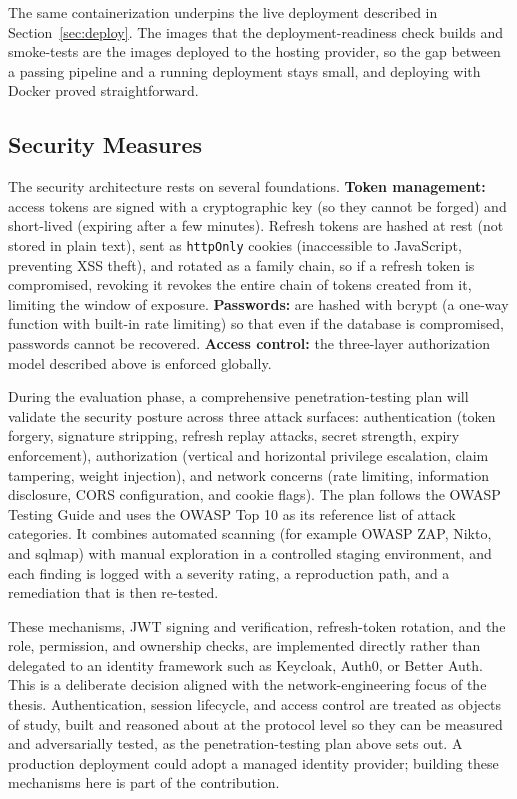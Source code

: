 The same containerization underpins the live deployment described in
Section~\ref{sec:deploy}. The images that the deployment-readiness check builds
and smoke-tests are the images deployed to the hosting provider, so the gap
between a passing pipeline and a running deployment stays small, and deploying
with Docker proved straightforward.

\subsection{Security Measures}
The security architecture rests on several foundations. \textbf{Token
management:} access tokens are signed with a cryptographic key (so they cannot
be forged) and short-lived (expiring after a few minutes). Refresh tokens are
hashed at rest (not stored in plain text), sent as \texttt{httpOnly} cookies
(inaccessible to JavaScript, preventing XSS theft), and rotated as a family
chain, so if a refresh token is compromised, revoking it revokes the entire chain of
tokens created from it, limiting the window of exposure. \textbf{Passwords:} are
hashed with bcrypt (a one-way function with built-in rate limiting) so that even
if the database is compromised, passwords cannot be recovered. \textbf{Access
control:} the three-layer authorization model described above is enforced
globally.

During the evaluation phase, a comprehensive penetration-testing plan will
validate the security posture across three attack surfaces: authentication
(token forgery, signature stripping, refresh replay attacks, secret strength,
expiry enforcement), authorization (vertical and horizontal privilege
escalation, claim tampering, weight injection), and network concerns (rate
limiting, information disclosure, CORS configuration, and cookie flags). The
plan follows the OWASP Testing Guide and uses the OWASP Top 10 as its reference
list of attack categories. It combines automated scanning (for example OWASP
ZAP, Nikto, and sqlmap) with manual exploration in a controlled staging
environment, and each finding is logged with a severity rating, a reproduction
path, and a remediation that is then re-tested.

These mechanisms, JWT signing and verification, refresh-token rotation, and the
role, permission, and ownership checks, are implemented directly rather than
delegated to an identity framework such as Keycloak, Auth0, or Better Auth. This
is a deliberate decision aligned with the network-engineering focus of the
thesis. Authentication, session lifecycle, and access control are treated as
objects of study, built and reasoned about at the protocol level so they can be
measured and adversarially tested, as the penetration-testing plan above sets
out. A production deployment could adopt a managed identity provider; building
these mechanisms here is part of the contribution.
